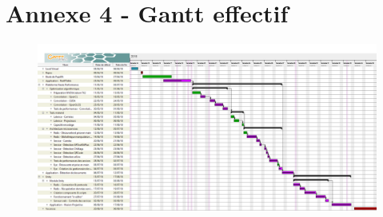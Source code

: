 \chapter*{Annexe 4 - Gantt effectif}
\label{annexe:gantt}

\begin{figure}
\centering
\includegraphics[width=\linewidth, angle=90]{images/GanttMemoireLong}
\end{figure}